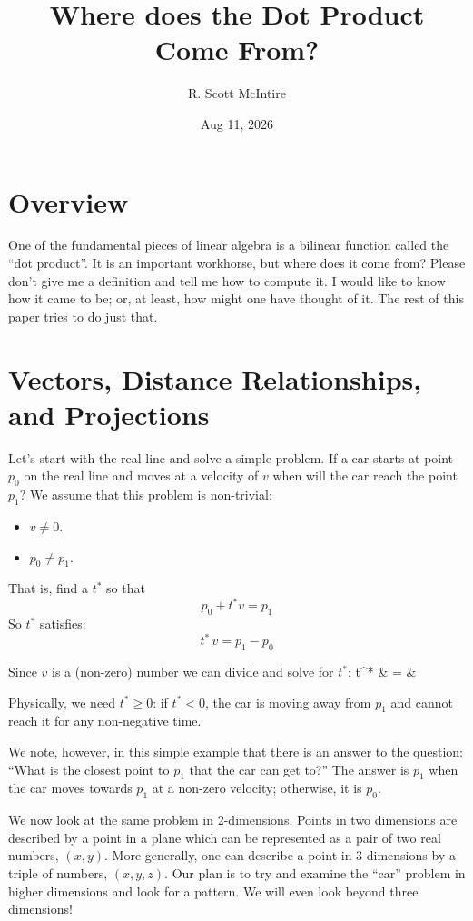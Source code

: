 \documentclass[12pt]{article}
\title{Where does the Dot Product Come From?}
\author{R. Scott McIntire}
\date{Aug 11, 2026}
\begin{document}
\maketitle

\section{Overview}
One of the fundamental pieces of linear algebra is a bilinear function
called the ``dot product''. It is an important workhorse, but where does
it come from? Please don't give me a definition and tell me how to compute it.
I would like to know how it came to be; or, at least, how might one
have thought of it. The rest of this paper tries to do just that.

\section{Vectors, Distance Relationships, and Projections}
Let's start with the real line and solve a simple problem. 
If a car starts at 
point $p_0$ on the real line and moves at a velocity of $v$ when will the car 
reach the point $p_1$? We assume that this problem is non-trivial:
\begin{itemize}
	\item $v \ne 0$.
	\item $p_0 \ne p_1$.
\end{itemize}

That is, find a $t^*$ so that
$$ p_0 + t^* v = p_1$$
So $t^*$ satisfies:
$$ t^* \, v = p_1 - p_0$$

Since $v$ is a (non-zero) number we can divide and solve for $t^*$:
\be
	t^* & = & 
\ee

Physically, we need $t^* \ge 0$: if $t^* < 0$, the car is moving
away from $p_1$ and cannot reach it for any non-negative time.

We note, however, in this simple example that there is an answer to the question:
``What is the closest point to $p_1$ that the car can get to?''
The answer is $p_1$ when the car moves towards $p_1$ at a non-zero velocity; otherwise,
it is $p_0$.

We now look at the same problem in 2-dimensions. Points in two dimensions 
are described by a point in a plane which can be represented as a pair of 
two real numbers, $(x, y)$. More generally, one can describe a point in 3-dimensions
by a triple of numbers, $(x, y, z)$. Our plan is to try and examine the ``car''
problem in higher dimensions and look for a pattern. We will even look beyond
three dimensions!
\end{document}

